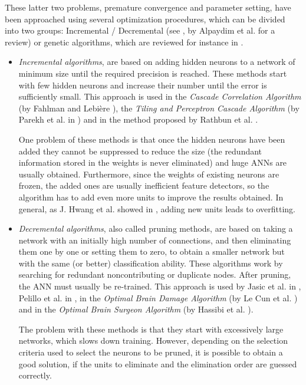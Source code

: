 \documentclass{llncs}
\begin{document}
These latter two problems, premature convergence and parameter setting, have been approached using several optimization procedures, which can be divided into two groups: Incremental / Decremental (see \cite{Alpaydim}, by Alpaydim et al. for a review) or genetic algorithms, which are reviewed for instance in \cite{balakrishnan95:EDNA}.

\begin{itemize}
      \item \emph{Incremental algorithms}, are based on adding hidden neurons to a network of minimum size until the required precision is reached. These methods start with few hidden neurons and increase their number until the error is sufficiently small. This approach is used in the \emph{Cascade Correlation Algorithm} (by Fahlman and Lebi\`{e}re \cite{FahlmanCASCOR}), the \emph{Tiling and Perceptron Cascade Algorithm} (by Parekh et al. in \cite{Parekh}) and in the method proposed by Rathbun et al. \cite{Rathbun}.

\noindent One problem of these methods is that once the hidden neurons have been added they cannot be suppressed to reduce the size (the redundant information stored in the weights is never eliminated) and huge ANNs are usually obtained. Furthermore, since the weights of existing neurons are frozen, the added ones are usually inefficient feature detectors, so the algorithm has to add even more units to improve the results obtained. In general, as J. Hwang et al. showed in \cite{Hwang}, adding new units leads to overfitting.

      \item \emph{Decremental algorithms}, also called pruning methods, are based on taking a network with an initially high number of connections, and then eliminating them one by one or setting them to zero, to obtain a smaller network but with the same (or better) classification ability.
These algorithms work by searching for redundant noncontributing or duplicate nodes.
After pruning, the ANN must usually be re-trained.
This approach is used by Jasic et al. in \cite{Jasic}, Pelillo et al. in \cite{Pelillo}, in the \emph{Optimal Brain Damage Algorithm} (by Le Cun et al. \cite{LeCun}) and in the \emph{Optimal Brain Surgeon Algorithm} (by Hassibi et al. \cite{Hassibi}).

\noindent The problem with these methods is that they start with excessively large networks, which slows down training. However, depending on the selection criteria used to select the neurons to be pruned, it is possible to obtain a good solution, if the units to eliminate and the elimination order are guessed correctly.
\end{itemize}
\end{document}
